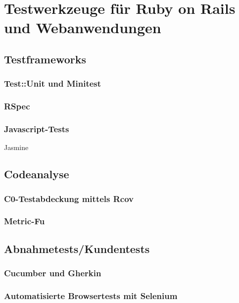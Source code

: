\section{Testwerkzeuge für Ruby on Rails und Webanwendungen}
\subsection{Testframeworks}

\subsubsection{Test::Unit und Minitest}

\subsubsection{RSpec}

\subsubsection{Javascript-Tests}

Jasmine


\subsection{Codeanalyse}
\subsubsection{C0-Testabdeckung mittels Rcov}

\subsubsection{Metric-Fu}


\subsection{Abnahmetests/Kundentests}

\subsubsection{Cucumber und Gherkin}

\subsubsection{Automatisierte Browsertests mit Selenium}
    